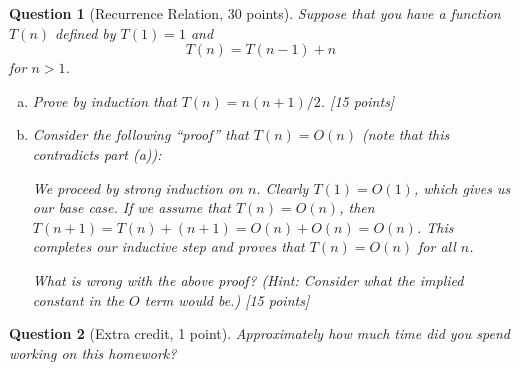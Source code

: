 \documentclass{article}
\newtheorem{ques}{Question}
\begin{document}
\begin{ques}[Recurrence Relation, 30 points]
Suppose that you have a function $T(n)$ defined by $T(1)=1$ and
$$
T(n) = T(n-1) + n
$$
for $n>1$.
\begin{enumerate}[(a)]
\item Prove by induction that $T(n) = n(n+1)/2$. [15 points]
\item Consider the following ``proof'' that $T(n) = O(n)$ (note that this contradicts part (a)):

We proceed by strong induction on $n$. Clearly $T(1)=O(1)$, which gives us our base case. If we assume that $T(n)=O(n)$, then $T(n+1) = T(n)+(n+1) = O(n)+O(n) = O(n)$. This completes our inductive step and proves that $T(n)=O(n)$ for all $n$.

What is wrong with the above proof? (Hint: Consider what the implied constant in the $O$ term would be.) [15 points]
\end{enumerate}
\end{ques}

\begin{ques}[Extra credit, 1 point]
Approximately how much time did you spend working on this homework?
\end{ques}
\end{document}
